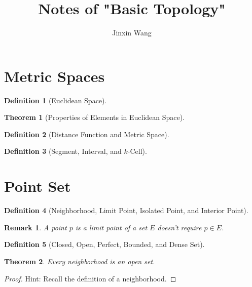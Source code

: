 \documentclass[onecolumn]{ctexart}
\title{Notes of "Basic Topology"}
\author{Jinxin Wang}
\date{}
\theoremstyle{break}
\newtheorem{definition}{Definition}
\newtheorem{theorem}{Theorem}
\newtheorem{remark}{Remark}
\begin{document}
\maketitle

\section{Metric Spaces}

\begin{definition}[Euclidean Space]
  
\end{definition}

\begin{theorem}[Properties of Elements in Euclidean Space]
  
\end{theorem}

\begin{definition}[Distance Function and Metric Space]
  
\end{definition}

\begin{definition}[Segment, Interval, and $k$-Cell]
  
\end{definition}

\section{Point Set}
\begin{definition}[Neighborhood, Limit Point, Isolated Point, and Interior Point]
  
\end{definition}
\begin{remark}
  A point $p$ is a limit point of a set $E$ doesn't require $p \in E$.
\end{remark}

\begin{definition}[Closed, Open, Perfect, Bounded, and Dense Set]
  
\end{definition}

\begin{theorem}
  Every neighborhood is an open set.
\end{theorem}
\begin{proof}
  Hint: Recall the definition of a neighborhood.
\end{proof}
\end{document}
